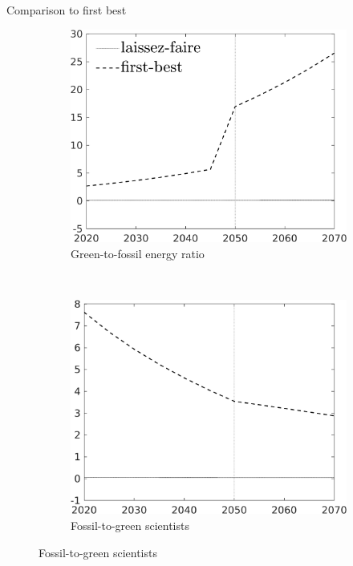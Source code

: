 \documentclass[11pt,aspectratio=169]{beamer}
\begin{document}
\begin{frame}{Comparison to first best}
\hypertarget{compfb}{}
\vspace{-3mm}
\pause
\centering
\begin{figure}
	\begin{subfigure}{0.45\textwidth}
		\caption{\normalsize{Green-to-fossil energy ratio} }
		\includegraphics[width=1\textwidth]{../codding_model/own_basedOnFried/optimalPol_010922_revision/figures/all_13Sept22_Tplus30/GFF_slides_CompEffLF_regime4_knspil0_spillover0_noskill0_sep0_xgrowth0_countec0_PV1_etaa0.79_lgd1.png}
	\end{subfigure}
	\begin{minipage}[]{0.05\textwidth}
		\
	\end{minipage}
	\begin{subfigure}{0.45\textwidth}
		\caption{\normalsize{Fossil-to-green scientists }}
		\includegraphics[width=1\textwidth]{../codding_model/own_basedOnFried/optimalPol_010922_revision/figures/all_13Sept22_Tplus30/sffsg_slides_CompEffLF_regime4_knspil0_spillover0_noskill0_sep0_xgrowth0_countec0_PV1_etaa0.79_lgd0.png}

\end{subfigure}
\end{figure}
\end{frame}
\end{document}
